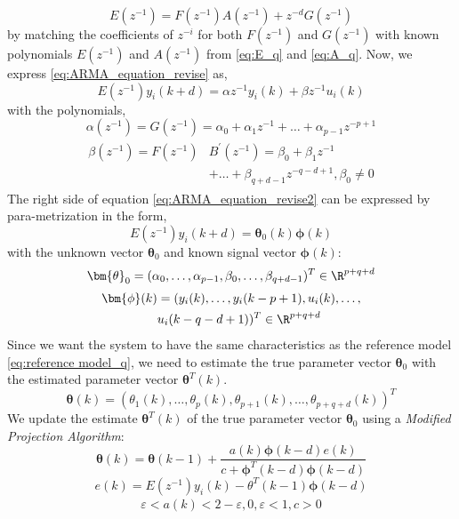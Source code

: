 
    \begin{equation}
    \label{eq:Start}
	E(z^{-1})=F(z^{-1})A(z^{-1})+z^{-d}G(z^{-1})
	\end{equation}
by matching the coefficients of $z^{-i}$ for both $F(z^{-1})$ and $G(z^{-1})$ with known polynomials $E(z^{-1})$ and $A(z^{-1})$ from \eqref{eq:E_q} and \eqref{eq:A_q}.
Now, we express \eqref{eq:ARMA_equation_revise} as,
	\begin{equation}
	\label{eq:ARMA_equation_revise2}
	E(z^{-1})y_i(k+d)={\alpha}z^{-1}y_i(k) + {\beta}z^{-1}u_i(k)
	\end{equation}
with the polynomials,
	\begin{equation}
	\alpha(z^{-1})=G(z^{-1})=\alpha_0+\alpha_1z^{-1}+ \dots +\alpha_{p-1}z^{-p+1}
	\end{equation}
	\begin{align}
	\begin{split}
	\beta( z^{-1})= F(z^{-1})&B^{'}(z^{-1})=\beta_0+\beta_1z^{-1} \\
	& + \dots +\beta_{q+d-1}z^{-q-d+1}, \beta_0\neq0
	\end{split}
	\end{align}
The right side of equation \eqref{eq:ARMA_equation_revise2} can be expressed by para-metrization in the form,
    \begin{equation}
	E(z^{-1})y_i(k+d)=\bm{\theta}_0(k)\bm{\phi}(k)
	\end{equation}
with the unknown vector $\bm{\theta}_0$ and known signal vector $\bm{\phi}(k)$:
    \begin{equation}
	\bm{\theta}_0=(\alpha_0, \dots ,\alpha_{p-1},\beta_0, \dots ,\beta_{q+d-1})^T \in \R^{p+q+d}
	\end{equation}
	\begin{align}
	\begin{split}
	\bm{\phi}(k)&=(y_i(k), \dots ,y_i(k-p+1),u_i(k), \dots , \\
	& u_i(k-q-d+1))^T \in \R^{p+q+d}
	\end{split}
	\end{align}
Since we want the system to have the same characteristics as the reference model \eqref{eq:reference model_q}, we need to estimate the true parameter vector $\bm{\theta}_0$ with the estimated parameter vector $\bm{\theta}^T(k)$. 
    \begin{equation}
    \bm{\theta}(k)=(\theta_1(k), \dots ,\theta_p(k),\theta_{p+1}(k), \dots ,\theta_{p+q+d}(k))^T
	\end{equation}
We update the estimate $\bm{\theta}^T(k)$ of the true parameter vector $\bm{\theta}_0$ using a \textit{Modified Projection Algorithm}:
	\begin{equation}
	\label{eq:Modified_Proj_Algorithm}
	\bm{\theta}(k)=\bm{\theta}(k-1)+\frac{a(k)\bm{\phi}(k-d)e(k)}{c+\bm{\phi}^T(k-d)\bm{\phi}(k-d)}
	\end{equation}
	\begin{equation}
	e(k)=E(z^{-1})y_i(k)-\theta^T(k-1)\bm{\phi}(k-d)
	\end{equation}
	\begin{align*}
	\varepsilon<a(k)<2-\varepsilon, 0,\varepsilon<1, c>0
	\end{align*}
	
